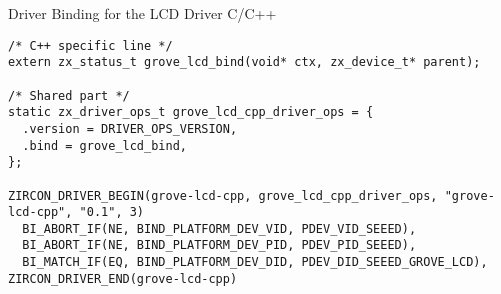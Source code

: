 \begin{listing} [H]
\caption{Driver Binding for the LCD Driver C/C++}
\label{lst:binding}
\begin{verbatim}
/* C++ specific line */
extern zx_status_t grove_lcd_bind(void* ctx, zx_device_t* parent);

/* Shared part */
static zx_driver_ops_t grove_lcd_cpp_driver_ops = {
  .version = DRIVER_OPS_VERSION,
  .bind = grove_lcd_bind,
};

ZIRCON_DRIVER_BEGIN(grove-lcd-cpp, grove_lcd_cpp_driver_ops, "grove-lcd-cpp", "0.1", 3)
  BI_ABORT_IF(NE, BIND_PLATFORM_DEV_VID, PDEV_VID_SEEED),
  BI_ABORT_IF(NE, BIND_PLATFORM_DEV_PID, PDEV_PID_SEEED),
  BI_MATCH_IF(EQ, BIND_PLATFORM_DEV_DID, PDEV_DID_SEEED_GROVE_LCD),
ZIRCON_DRIVER_END(grove-lcd-cpp)
\end{verbatim}
\end{listing}

